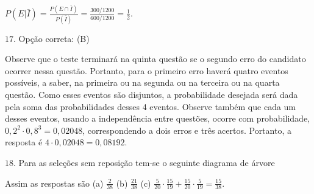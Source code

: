 \(P(E|\bar{I})=\frac{P(E\cap \bar{I})}{P(\bar{I})}=\frac{300/1200}{600/1200}=\frac{1}{2}.\)

\(17.\) Opção correta: (B)

Observe que o teste terminará na quinta questão se o segundo erro do candidato ocorrer nessa questão. Portanto, para o primeiro erro haverá quatro eventos possíveis, a saber, na primeira ou na segunda ou na terceira ou na quarta questão. Como esses eventos são disjuntos, a probabilidade desejada será dada pela soma das probabilidades desses 4 eventos. Observe também que cada um desses eventos, usando a independência entre questões, ocorre com probabilidade, \(0,2^2\cdot 0,8^3=0,02048\), correspondendo a dois erros e três acertos. Portanto, a resposta é \(4\cdot 0,02048=0,08192\).

\(18.\) Para as seleções sem reposição tem-se o seguinte diagrama de árvore
\begin{center}\end{center}
Assim as respostas são (a) \(\frac{2}{38}\) (b) \(\frac{21}{38}\)  (c) \(\frac{5}{20}\cdot\frac{15}{19}+\frac{15}{20}\cdot\frac{5}{19}=\frac{15}{38}\).

